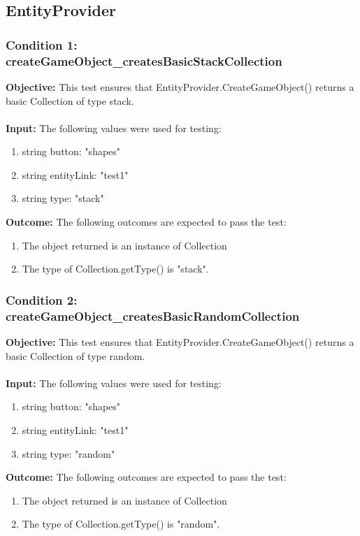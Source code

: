 \documentclass[a4paper,12pt]{article}
\begin{document}
	\subsection{EntityProvider}
		\subsubsection{Condition 1: createGameObject\_createsBasicStackCollection}
			\textbf{Objective:} This test ensures that EntityProvider.CreateGameObject() returns a basic Collection of type stack.\\\\
			\textbf{Input:} The following values were used for testing:
				\begin{enumerate}
					\item string button: "shapes"
					\item string entityLink: "test1"
					\item string type: "stack"
				\end{enumerate}
			\textbf{Outcome:} The following outcomes are expected to pass the test:
				\begin{enumerate}
					\item The object returned is an instance of Collection
					\item The type of Collection.getType() is "stack".
				\end{enumerate}
		\subsubsection{Condition 2: createGameObject\_createsBasicRandomCollection}
			\textbf{Objective:} This test ensures that EntityProvider.CreateGameObject() returns a basic Collection of type random.\\\\
			\textbf{Input:} The following values were used for testing:
				\begin{enumerate}
					\item string button: "shapes"
					\item string entityLink: "test1"
					\item string type: "random"
				\end{enumerate}
			\textbf{Outcome:} The following outcomes are expected to pass the test:
				\begin{enumerate}
					\item The object returned is an instance of Collection
					\item The type of Collection.getType() is "random".
				\end{enumerate}
\end{document}
